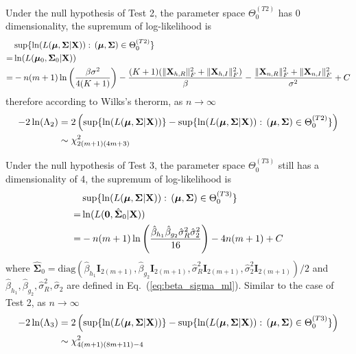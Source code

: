 \documentclass[journal,draftcls,onecolumn,12pt,twoside]{IEEEtran}
\begin{document}
Under the null hypothesis of Test 2, the parameter space $\Theta_0^{(T2)}$ has 0
dimensionality, the supremum of log-likelihood is
\begin{align}
  & \sup \{\ln(L(\bm{\mu}, \mathbf{\Sigma}|\mathbf{X})):\,(\bm{\mu},
  \mathbf{\Sigma})\in \Theta_0^{(T2)}\} \notag \\
  = & \ln(L(\bm{\mu}_0,
  \mathbf{\Sigma}_0|\mathbf{X})) \notag \\
  = & -n(m+1)
  \ln\left(\frac{\beta \sigma^2}{4(K+1)}\right) -
  \frac{(K+1)(\|\mathbf{X}_{h,R}\|_F^2 + \|\mathbf{X}_{h,I}\|_F^2)}{\beta} -
  \frac{\|\mathbf{X}_{n,R}\|_F^2 + \|\mathbf{X}_{n,I}\|_F^2}{\sigma^2}
  + C
\end{align}
therefore according to Wilks's therorm, as $n\rightarrow\infty$ 
\begin{align}
  -2\ln(\Lambda_2) &= 2\left(\sup \{\ln(L(\bm{\mu},
  \mathbf{\Sigma}|\mathbf{X}))\} - \sup \{\ln(L(\bm{\mu}, \mathbf{\Sigma}|\mathbf{X})):\,(\bm{\mu},
  \mathbf{\Sigma})\in \Theta_0^{(T2)}\}\right) \notag \\
  &\sim \chi_{2(m+1)(4m+3)}^2
\end{align}

Under the null hypothesis of Test 3, the parameter space $\Theta_0^{(T3)}$ still
has a dimensionality of 4, the supremum of log-likelihood is
\begin{align}
  & \sup \{\ln(L(\bm{\mu}, \mathbf{\Sigma}|\mathbf{X})):\,(\bm{\mu},
  \mathbf{\Sigma})\in \Theta_0^{(T3)}\} \notag \\
  = & \ln(L(\mathbf{0},
  \hat{\mathbf{\Sigma}}_0|\mathbf{X})) \notag \\
  = & -n(m+1)\ln\left(\frac{\hat{\beta}_{h_1}\hat{\beta}_{g_2}
    \hat{\sigma}_R^2\hat{\sigma}_2^2}{16}\right) -
    4n(m+1) + C
\end{align}
where $\hat{\mathbf{\Sigma}}_0 =
\mbox{diag}(\hat{\beta}_{h_1}\mathbf{I}_{2(m+1)},
\hat{\beta}_{g_2}\mathbf{I}_{2(m+1)}, \hat{\sigma}_R^2\mathbf{I}_{2(m+1)},
\hat{\sigma}_2^2\mathbf{I}_{2(m+1)}) / 2$ and $\hat{\beta}_{h_1},
\hat{\beta}_{g_2}, \hat{\sigma}_R^2, \hat{\sigma}_2$ are defined in
Eq.~(\ref{eq:beta_sigma_ml}). Similar to the case of Test 2, as
$n\rightarrow\infty$
\begin{align}
  -2\ln(\Lambda_3) &= 2\left(\sup \{\ln(L(\bm{\mu},
  \mathbf{\Sigma}|\mathbf{X}))\} - \sup \{\ln(L(\bm{\mu}, \mathbf{\Sigma}|\mathbf{X})):\,(\bm{\mu},
  \mathbf{\Sigma})\in \Theta_0^{(T3)}\}\right) \notag \\
  &\sim \chi_{4(m+1)(8m+11) - 4}^2
\end{align}




\end{document}
